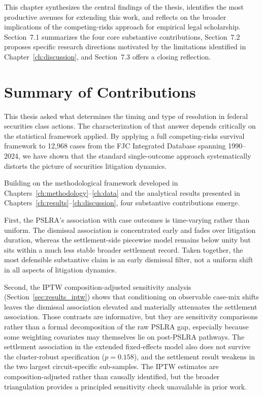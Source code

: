 
This chapter synthesizes the central findings of the thesis,
identifies the most productive avenues for extending this
work, and reflects on the broader implications of the
competing-risks approach for empirical legal scholarship.
Section~7.1 summarizes the four core substantive
contributions,
Section~7.2 proposes specific research directions motivated
by the limitations identified in
Chapter~\ref{ch:discussion}, and Section~7.3 offers a
closing reflection.

\section{Summary of Contributions}

This thesis asked what determines the timing and type of
resolution in federal securities class actions. The
characterization of that answer depends critically on the
statistical framework applied. By applying a full
competing-risks survival
framework to 12,968 cases from the FJC Integrated Database
spanning 1990--2024, we have shown that the standard
single-outcome approach systematically distorts the picture
of securities litigation dynamics.

Building on the methodological framework developed in
Chapters~\ref{ch:methodology}--\ref{ch:data} and the
analytical results presented in
Chapters~\ref{ch:results}--\ref{ch:discussion}, four
substantive contributions emerge.

First, the PSLRA's association with case outcomes is
time-varying rather than uniform. The dismissal association is
concentrated early and fades over litigation duration,
whereas the settlement-side piecewise model remains below
unity but sits within a much less stable broader settlement
record. Taken together, the most defensible substantive claim
is an early dismissal filter, not a uniform shift in all
aspects of litigation dynamics.

Second, the IPTW composition-adjusted sensitivity analysis
(Section~\ref{sec:results_iptw}) shows that conditioning on
observable case-mix shifts leaves the dismissal association
elevated and materially attenuates the settlement
association. Those contrasts are informative, but they are
sensitivity comparisons rather than a formal decomposition of
the raw PSLRA gap, especially because some weighting
covariates may themselves lie on post-PSLRA pathways. The
settlement association in the extended fixed-effects model
also does not survive the cluster-robust specification
($p = 0.158$), and the settlement result weakens in the two
largest circuit-specific sub-samples. The IPTW estimates are
composition-adjusted rather than causally identified, but the
broader triangulation provides a principled sensitivity check
unavailable in prior work.

